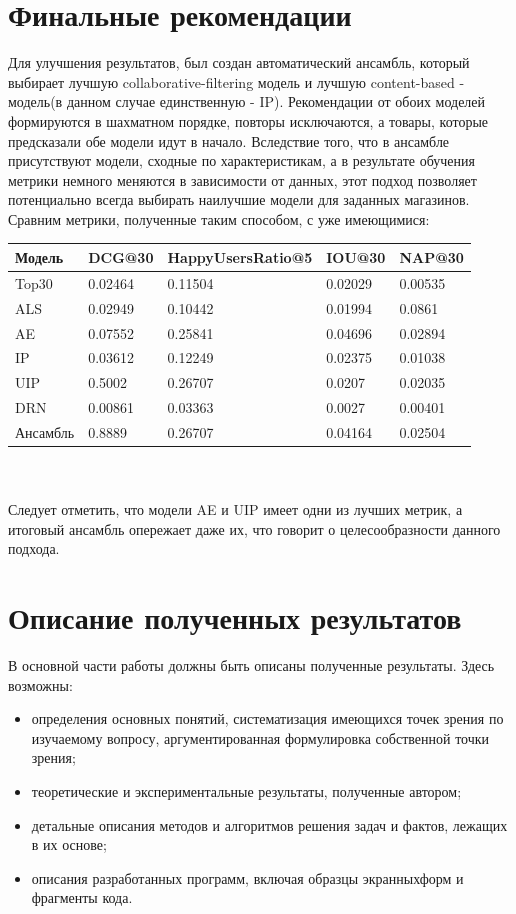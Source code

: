 \documentclass[14pt]{mmcs_article}
\begin{document}
\section{Финальные рекомендации}
Для улучшения результатов, был создан автоматический ансамбль, который выбирает лучшую collaborative-filtering модель и лучшую content-based - модель(в данном случае единственную - IP). Рекомендации от обоих моделей формируются в шахматном порядке, повторы исключаются, а товары, которые предсказали обе модели идут в начало. Вследствие того, что в ансамбле присутствуют модели, сходные по характеристикам, а в результате обучения метрики немного меняются в зависимости от данных, этот подход позволяет потенциально всегда выбирать наилучшие модели для заданных магазинов.
Сравним метрики, полученные таким способом, с уже имеющимися:\\
\begin{tabular}{| l |l| l| l| l|}
	\hline
	Модель & DCG@30 & HappyUsersRatio@5 & IOU@30 &  NAP@30 \\
	\hline
	Top30 & 0.02464 & 0.11504 & 0.02029 & 0.00535 \\
	\hline
	ALS & 0.02949 & 0.10442 & 0.01994 &  0.0861 \\
	\hline
	AE & 0.07552 & 0.25841 & 0.04696 &  0.02894 \\
	\hline
	IP & 0.03612 & 0.12249 & 0.02375 &  0.01038 \\
	\hline
	UIP & 0.5002 & 0.26707 & 0.0207 &  0.02035 \\
	\hline
	DRN & 0.00861 & 0.03363 & 0.0027 & 0.00401 \\
	\hline
	Ансамбль & 0.8889 & 0.26707 & 0.04164 &  0.02504 \\
	\hline
\end{tabular}\\
\\
Следует отметить, что модели AE и UIP имеет одни из лучших метрик, а итоговый ансамбль опережает даже их, что говорит о целесообразности данного подхода.

\newpage
\section{Описание полученных результатов}\label{dsfs}

В основной части работы должны быть описаны полученные результаты. Здесь возможны:
\begin{itemize}
\item определения основных понятий, систематизация имеющихся точек зрения по изучаемому вопросу, аргументированная формулировка собственной точки зрения;
\item теоретические и экспериментальные результаты, полученные автором;
\item детальные описания методов и алгоритмов решения задач и фактов, лежащих в их основе;
\item описания разработанных программ, включая образцы экранных\linebreak форм и фрагменты кода.
\end{itemize}
\end{document}
